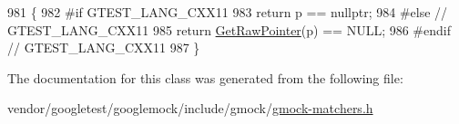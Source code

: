 \begin{DoxyCode}
981                                                      \{
982 \textcolor{preprocessor}{#if GTEST\_LANG\_CXX11}
983     \textcolor{keywordflow}{return} p == \textcolor{keyword}{nullptr};
984 \textcolor{preprocessor}{#else  // GTEST\_LANG\_CXX11}
985     \textcolor{keywordflow}{return} \hyperlink{namespacetesting_1_1internal_ae88d1a6f95165c43c27a6c0e2d357e61}{GetRawPointer}(p) == NULL;
986 \textcolor{preprocessor}{#endif  // GTEST\_LANG\_CXX11}
987   \}
\end{DoxyCode}


The documentation for this class was generated from the following file\+:\begin{DoxyCompactItemize}
\item 
vendor/googletest/googlemock/include/gmock/\hyperlink{gmock-matchers_8h}{gmock-\/matchers.\+h}\end{DoxyCompactItemize}
